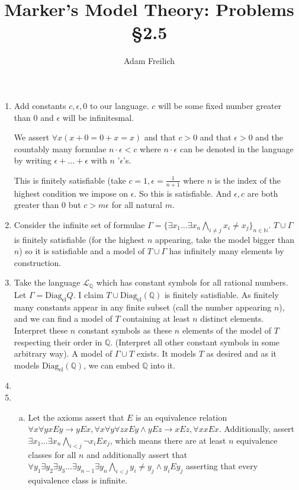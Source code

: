 \documentclass[10pt]{article}
\author{Adam Freilich}
\title{Marker's Model Theory: Problems \S 2.5}
\newcommand{\N}{\mathbb{N}}
\newcommand{\Q}{\mathbb{Q}}
\newcommand{\A}{\forall}
\newcommand{\mcL}{\mathcal{L}}
\newcommand{\E}{\exists}
\newcommand{\eldiag}{\text{Diag}_\text{el}}
\begin{document}
\maketitle


\begin{enumerate}[1.]
\item Add constants \(c, \epsilon, 0\) to our language. \(c\) will be some fixed number greater than 0 and \(\epsilon\) will be infinitesmal.

We assert \(\A x (x + 0 = 0 + x = x)\) and that \(c > 0\) and that \(\epsilon > 0\) and the countably many formulae \(n \cdot \epsilon < c\) where \(n \cdot \epsilon\) can be denoted in the language by writing \(\epsilon + \ldots + \epsilon\) with \(n\) '\(\epsilon\)'s. 

This is finitely satisfiable (take \(c = 1, \epsilon = \frac{1}{n+1}\) where \(n\) is the index of the highest condition we impose on \(\epsilon\). So this is satisfiable. And \(\epsilon, c\) are both greater than 0 but \(c > m\epsilon\) for all natural \(m\).   

 
\item Consider the infinite set of formulae \(\Gamma = \{\E x_1 \ldots \E x_n \bigwedge_{i \neq j}x_i \neq x_j\}_{n \in \N}\). \(T \cup \Gamma\) is finitely satisfiable (for the highest \(n\) appearing, take the model bigger than \(n\)) so it is satisfiable and a model of \(T \cup \Gamma\) has infinitely many elements by construction. 
 
\item Take the language \(\mcL_\Q\) which has constant symbols for all rational numbers. Let \(\Gamma = \eldiag{Q}\). I claim \(T \cup \eldiag(\Q)\) is finitely satisfiable. As finitely many constants appear in any finite subset (call the number appearing \(n\)), and we can find a model of \(T\) containing at least \(n\) distinct elements. Interpret these \(n\) constant symbols as these \(n\) elements of the model of \(T\) respecting their order in \(\Q\). (Interpret all other constant symbols in some arbitrary way). A model of \(\Gamma \cup T\) exists. It models \(T\) as desired and as it models \(\eldiag(\Q)\), we can embed \(\Q\) into it.  
 
\item 
 
\item 
\begin{enumerate}[a)]
  \item Let the axioms assert that \(E\) is an equivalence relation \(\A x \A y xEy \to yEx, \A x \A y \A z xEy \land yEz \to xEz, \A x xEx\). Additionally, assert \(\E x_1 \ldots \E x_n \bigwedge_{i < j} \neg x_i E x_j\), which means there are at least \(n\) equivalence classes for all \(n\) and additionally assert that \(\A y_1 \E y_2 \E y_3 \ldots \E y_{n-1} \E y_n \bigwedge_{i < j} y_i \neq y_j \land y_i E y_j\) asserting that every equivalence class is infinite. 


\end{enumerate}
\end{enumerate}
\end{document}

